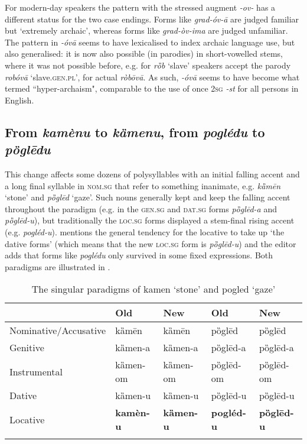 \documentclass[output=paper,modfonts,nonflat
]{langsci/langscibook}
\begin{document}
For modern-day speakers the pattern with the stressed augment \textit{-ov-} has a different status for the two case endings. Forms like \textit{grad-óv-ā} are judged familiar but `extremely archaic', whereas forms like \textit{grad-òv-ima} are judged unfamiliar. The pattern in \textit{-óvā} seems to have lexicalised to index archaic language use, but also generalised: it is now also possible (in parodies) in short-vowelled stems, where it was not possible before, e.g. for \textit{rȍb} `slave' speakers accept the parody \textit{robóvā} `slave.\textsc{gen}.\textsc{pl}', for actual \textit{ròbōvā}. As such, \textit{-óvā} seems to have become what \citet{Janda1994} termed ``hyper-archaism", comparable to the use of once 2\textsc{sg} \textit{-st} for all persons in English. 

\subsection{From \textit{kamènu} to \textit{kȁmenu}, from \textit{poglédu} to \textit{pȍglēdu}} \label{sec:kager:subsec24}
This change affects some dozens of polysyllables with an initial falling accent and a long final syllable in \textsc{nom}.\textsc{sg} that refer to something inanimate, e.g.\textit{ kȁmēn} `stone' and \textit{pȍglēd} `gaze'. Such nouns generally kept and keep the falling accent throughout the paradigm (e.g. in the  \textsc{gen}.\textsc{sg} and  \textsc{dat}.\textsc{sg} forms \textit{pȍglēd-a} and \textit{pȍglēd-u}), but traditionally the \textsc{loc}.\textsc{sg} forms displayed a stem-final rising accent (e.g. \textit{pogléd-u}). \citet[30]{Klaic2013} mentions the general tendency for the locative to take up `the dative forms' (which means that the new \textsc{loc}.\textsc{sg} form is \textit{pȍglēd-u}) and the editor adds that forms like \textit{poglédu} only survived in some fixed expressions. Both paradigms are illustrated in .

\begin{table}
\caption{The singular paradigms of kamen `stone' and pogled `gaze'}
\label{tab:kager:5}
 \begin{tabular}{  l l l l l }
  \lsptoprule
& Old & New & Old & New\\ 
 \midrule
 Nominative/Accusative  &  kȁmēn  &  kȁmēn&  pȍglēd &  pȍglēd \\
Genitive  &  kȁmen-a  &  kȁmen-a &  pȍglēd-a &  pȍglēd-a \\  
Instrumental  &  kȁmen-om  &  kȁmen-om &  pȍglēd-om &  pȍglēd-om \\  
Dative  &  kȁmen-u  &  kȁmen-u &  pȍglēd-u &  pȍglēd-u \\  
Locative  & \textbf{kamèn-u} &  \textbf{kȁmen-u} &  \textbf{pogléd-u} &  \textbf{pȍglēd-u} \\
  \lspbottomrule
 \end{tabular}
\end{table}
\end{document}
